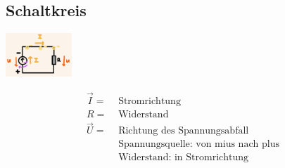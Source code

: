 \subsection{Schaltkreis}
    \vspace{-1mm}
    \begin{minipage}{0.49\linewidth}
        \begin{footnotesize}
            \begin{center}
                \vspace{2mm}
                \includegraphics[width = 25mm]{src/images/schaltkreis.png}
            \end{center}
        \end{footnotesize}
    \end{minipage}
    \begin{minipage}{0.5\linewidth}
        \begin{scriptsize}
            \begin{center}
                \begin{align*}
                    \vec{I} = &\text{ Stromrichtung}
                    \\R = &\text{ Widerstand} 
                    \\\vec{U} = &\text{ Richtung des Spannungsabfall}
                    \\&\text{ Spannungsquelle: von mius nach plus}
                    \\&\text{ Widerstand: in Stromrichtung}
                \end{align*}
            \end{center}
        \end{scriptsize}
    \end{minipage}
    \vfill

